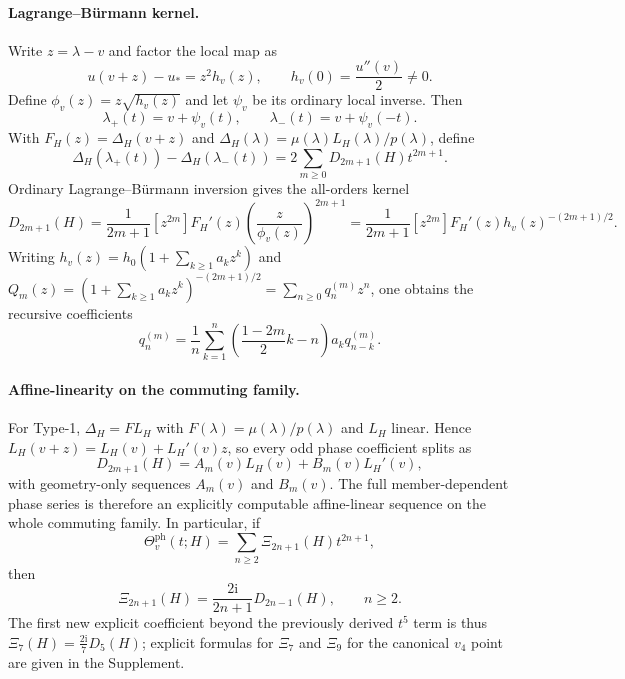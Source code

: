 \documentclass[aps,prl,reprint,superscriptaddress,nofootinbib]{revtex4-2}
\newcommand{\ii}{\mathrm{i}}
\newcommand{\LH}{L_H}
\begin{document}
\paragraph*{Lagrange--B\"urmann kernel.}
Write $z=\lambda-v$ and factor the local map as
\begin{equation}
 u(v+z)-u_*=z^2h_v(z),\qquad h_v(0)=\frac{u''(v)}{2}\neq 0.
\end{equation}
Define $\phi_v(z)=z\sqrt{h_v(z)}$ and let $\psi_v$ be its ordinary local inverse. Then
\begin{equation}
 \lambda_+(t)=v+\psi_v(t),\qquad \lambda_-(t)=v+\psi_v(-t).
\end{equation}
With $F_H(z)=\Delta_H(v+z)$ and $\Delta_H(\lambda)=\mu(\lambda)\LH(\lambda)/p(\lambda)$, define
\begin{equation}
 \Delta_H(\lambda_+(t)) - \Delta_H(\lambda_-(t)) = 2\sum_{m\ge 0}D_{2m+1}(H)t^{2m+1}.
\end{equation}
Ordinary Lagrange--B\"urmann inversion gives the all-orders kernel
\begin{equation}
 D_{2m+1}(H)=\frac{1}{2m+1}[z^{2m}]F_H'(z)\left(\frac{z}{\phi_v(z)}\right)^{2m+1}
 =\frac{1}{2m+1}[z^{2m}]F_H'(z)h_v(z)^{-(2m+1)/2}.
 \label{eq:kernel}
\end{equation}
Writing $h_v(z)=h_0(1+\sum_{k\ge1}a_kz^k)$ and $Q_m(z)=(1+\sum_{k\ge1}a_kz^k)^{-(2m+1)/2}=\sum_{n\ge0}q_n^{(m)}z^n$, one obtains the recursive coefficients
\begin{equation}
 q_n^{(m)}=\frac{1}{n}\sum_{k=1}^n\left(\frac{1-2m}{2}k-n\right)a_kq_{n-k}^{(m)}.
 \label{eq:qrec}
\end{equation}

\paragraph*{Affine-linearity on the commuting family.}
For Type-1, $\Delta_H=FL_H$ with $F(\lambda)=\mu(\lambda)/p(\lambda)$ and $\LH$ linear. Hence $\LH(v+z)=\LH(v)+\LH'(v)z$, so every odd phase coefficient splits as
\begin{equation}
 D_{2m+1}(H)=A_m(v)\LH(v)+B_m(v)\LH'(v),
 \label{eq:affine}
\end{equation}
with geometry-only sequences $A_m(v)$ and $B_m(v)$. The full member-dependent phase series is therefore an explicitly computable affine-linear sequence on the whole commuting family. In particular, if
\begin{equation}
 \Theta_v^{\mathrm{ph}}(t;H)=\sum_{n\ge2}\Xi_{2n+1}(H)t^{2n+1},
\end{equation}
then
\begin{equation}
 \Xi_{2n+1}(H)=\frac{2\ii}{2n+1}D_{2n-1}(H),\qquad n\ge 2.
 \label{eq:Xi-relation}
\end{equation}
The first new explicit coefficient beyond the previously derived $t^5$ term is thus $\Xi_7(H)=\frac{2\ii}{7}D_5(H)$; explicit formulas for $\Xi_7$ and $\Xi_9$ for the canonical $v_4$ point are given in the Supplement.
\end{document}
